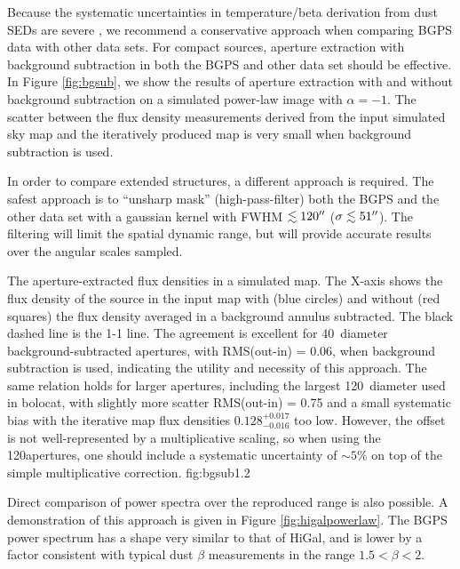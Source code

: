 Because the systematic uncertainties in temperature/beta derivation from dust
SEDs are severe \citep[e.g.][]{Shetty2009a,Shetty2009b,Kelly2012a}, we
recommend a conservative approach when comparing BGPS data with other data
sets. 
For compact sources, aperture extraction with background subtraction in both
the BGPS and other data set should be effective.  In Figure \ref{fig:bgsub}, we
show the results of aperture extraction with and without background subtraction
on a simulated power-law image with $\alpha=-1$.  The scatter between the flux density
measurements derived from the input simulated sky map and the iteratively
produced map is very small when background subtraction is used.

In order to compare extended structures, a different approach is required.  The
safest approach is to ``unsharp mask'' (high-pass-filter) both the BGPS and the other data set with a
gaussian kernel with FWHM $\lesssim120\mbox{$^{\prime\prime}$}$ ($\sigma \lesssim 51 \mbox{$^{\prime\prime}$}$).
The filtering will limit the spatial dynamic range, but will provide accurate
results over the angular scales sampled.


{The aperture-extracted flux densities in a simulated map.  The X-axis shows the flux density
of the source in the input map with (blue circles) and without (red squares)
the flux density averaged in a background annulus subtracted.  The black dashed line is the
1-1 line.  The agreement is
excellent for 40\arcsec\ diameter background-subtracted apertures, with RMS(out-in) =
0.06, when background subtraction is used, indicating the utility and necessity
of this approach.  The same relation holds for larger apertures, including the
largest 120\arcsec\ diameter used in bolocat, with slightly more scatter RMS(out-in) =
0.75 and a small systematic bias with the iterative map flux densities
$0.128^{+0.017}_{-0.016}$ too low.  However, the offset is not well-represented
by a multiplicative scaling, so when using the 120\arcsec apertures, one should
include a systematic uncertainty of $\sim5\%$ on top of the simple
multiplicative correction.
}
{fig:bgsub}{1.2}

Direct comparison of power spectra over the reproduced range is also possible.
A demonstration of this approach is given in Figure \ref{fig:higalpowerlaw}.
The BGPS power spectrum has a shape very similar to that of HiGal, and is lower
by a factor consistent with typical dust $\beta$ measurements in the range
$1.5 < \beta < 2$.

